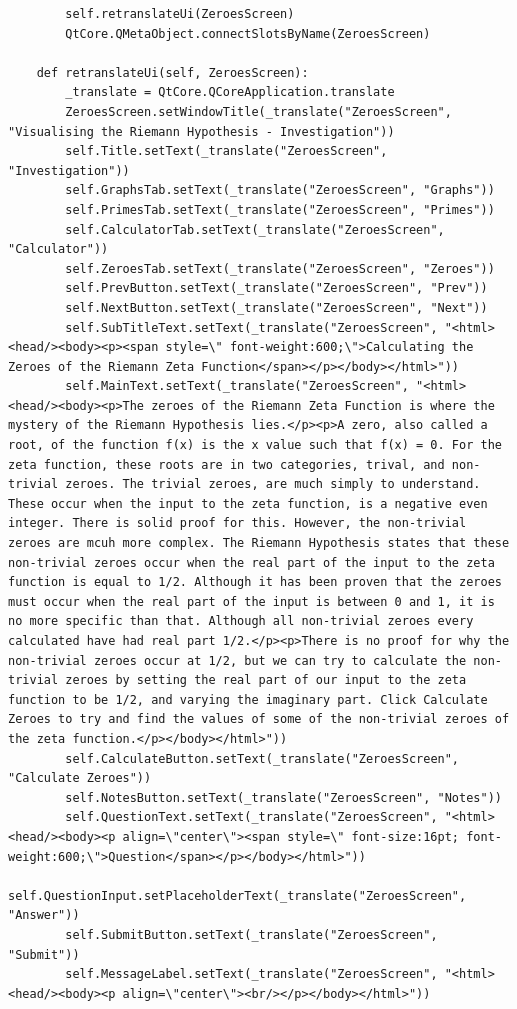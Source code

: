 \documentclass[12pt]{article}
\begin{document}
\begin{lstlisting}
        self.retranslateUi(ZeroesScreen)
        QtCore.QMetaObject.connectSlotsByName(ZeroesScreen)

    def retranslateUi(self, ZeroesScreen):
        _translate = QtCore.QCoreApplication.translate
        ZeroesScreen.setWindowTitle(_translate("ZeroesScreen", "Visualising the Riemann Hypothesis - Investigation"))
        self.Title.setText(_translate("ZeroesScreen", "Investigation"))
        self.GraphsTab.setText(_translate("ZeroesScreen", "Graphs"))
        self.PrimesTab.setText(_translate("ZeroesScreen", "Primes"))
        self.CalculatorTab.setText(_translate("ZeroesScreen", "Calculator"))
        self.ZeroesTab.setText(_translate("ZeroesScreen", "Zeroes"))
        self.PrevButton.setText(_translate("ZeroesScreen", "Prev"))
        self.NextButton.setText(_translate("ZeroesScreen", "Next"))
        self.SubTitleText.setText(_translate("ZeroesScreen", "<html><head/><body><p><span style=\" font-weight:600;\">Calculating the Zeroes of the Riemann Zeta Function</span></p></body></html>"))
        self.MainText.setText(_translate("ZeroesScreen", "<html><head/><body><p>The zeroes of the Riemann Zeta Function is where the mystery of the Riemann Hypothesis lies.</p><p>A zero, also called a root, of the function f(x) is the x value such that f(x) = 0. For the zeta function, these roots are in two categories, trival, and non-trivial zeroes. The trivial zeroes, are much simply to understand. These occur when the input to the zeta function, is a negative even integer. There is solid proof for this. However, the non-trivial zeroes are mcuh more complex. The Riemann Hypothesis states that these non-trivial zeroes occur when the real part of the input to the zeta function is equal to 1/2. Although it has been proven that the zeroes must occur when the real part of the input is between 0 and 1, it is no more specific than that. Although all non-trivial zeroes every calculated have had real part 1/2.</p><p>There is no proof for why the non-trivial zeroes occur at 1/2, but we can try to calculate the non-trivial zeroes by setting the real part of our input to the zeta function to be 1/2, and varying the imaginary part. Click Calculate Zeroes to try and find the values of some of the non-trivial zeroes of the zeta function.</p></body></html>"))
        self.CalculateButton.setText(_translate("ZeroesScreen", "Calculate Zeroes"))
        self.NotesButton.setText(_translate("ZeroesScreen", "Notes"))
        self.QuestionText.setText(_translate("ZeroesScreen", "<html><head/><body><p align=\"center\"><span style=\" font-size:16pt; font-weight:600;\">Question</span></p></body></html>"))
        self.QuestionInput.setPlaceholderText(_translate("ZeroesScreen", "Answer"))
        self.SubmitButton.setText(_translate("ZeroesScreen", "Submit"))
        self.MessageLabel.setText(_translate("ZeroesScreen", "<html><head/><body><p align=\"center\"><br/></p></body></html>"))
\end{lstlisting}
\end{document}
